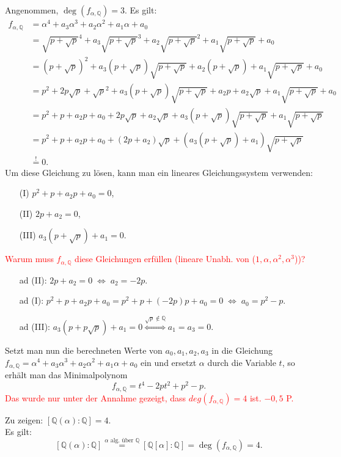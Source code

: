\documentclass[12pt]{article}
\newcommand{\corr}[1]{\textcolor{red}{#1}}
\newcommand{\gdw}{\;\Longleftrightarrow\;}
\newcommand{\grad}{\operatorname{deg}}
\begin{document}
\begin{enumerate}
	Angenommen, $\grad(f_{\alpha,\mathbb{Q}})=3$. Es gilt:
	\begin{align*}
		f_{\alpha,\mathbb{Q}}&=\alpha^4+a_3\alpha^3+a_2\alpha^2+a_1\alpha+a_0 \\
		&=\sqrt{p+\sqrt{p}}^4+a_3\sqrt{p+\sqrt{p}}^3+a_2\sqrt{p+\sqrt{p}}^2+a_1\sqrt{p+\sqrt{p}}+a_0 \\
		&=(p+\sqrt{p})^2+a_3(p+\sqrt{p})\sqrt{p+\sqrt{p}}+a_2(p+\sqrt{p})+a_1\sqrt{p+\sqrt{p}}+a_0 \\
		&=p^2+2p\sqrt{p}+\sqrt{p}^2+a_3(p+\sqrt{p})\sqrt{p+\sqrt{p}}+a_2p+a_2\sqrt{p}+a_1\sqrt{p+\sqrt{p}}+a_0 \\
		&=p^2+p+a_2p+a_0+2p\sqrt{p}+a_2\sqrt{p}+a_3(p+\sqrt{p})\sqrt{p+\sqrt{p}}+a_1\sqrt{p+\sqrt{p}} \\
		&=p^2+p+a_2p+a_0+(2p+a_2)\sqrt{p}+(a_3(p+\sqrt{p})+a_1)\sqrt{p+\sqrt{p}} \\
		&\overset{!}{=}0.
	\end{align*}
	Um diese Gleichung zu lösen, kann man ein lineares Gleichungssystem verwenden:
	\begin{enumerate}
		\item[(I)] $p^2+p+a_2p+a_0=0$,
		\item[(II)] $2p+a_2=0$,
		\item[(III)] $a_3(p+\sqrt{p})+a_1=0$.
	\end{enumerate}
\corr{Warum muss $f_{\alpha, \mathbb{Q}}$ diese Gleichungen erfüllen (lineare Unabh. von ($1,\alpha, \alpha^2,\alpha^3$))?}
	\begin{enumerate}
		\item[ad (II):] $2p+a_2=0\gdw a_2=-2p$.
		\item[ad (I):] $p^2+p+a_2p+a_0=p^2+p+(-2p)p+a_0=0\gdw a_0=p^2-p$.
		\item[ad (III):] $a_3(p+p\sqrt{p})+a_1=0\overset{\sqrt{p}\notin\mathbb{Q}}{\gdw}a_1=a_3=0$.
	\end{enumerate}
	Setzt man nun die berechneten Werte von $a_0,a_1,a_2,a_3$ in die Gleichung $f_{\alpha,\mathbb{Q}}=\alpha^4+a_3\alpha^3+a_2\alpha^2+a_1\alpha+a_0$ ein und ersetzt $\alpha$ durch die Variable $t$, so erhält man das Minimalpolynom
	$$f_{\alpha,\mathbb{Q}}=t^4-2pt^2+p^2-p.$$
\corr{Das wurde nur unter der Annahme gezeigt, dass $deg(f_{\alpha, \mathbb{Q}})=4$ ist. $-0,5$ P.}
	
	Zu zeigen: $\left[\mathbb{Q}(\alpha):\mathbb{Q}\right]=4$. \\
	Es gilt: $$\left[\mathbb{Q}(\alpha):\mathbb{Q}\right]\overset{\alpha\text{ alg. über }\mathbb{Q}}{=}\left[\mathbb{Q}[\alpha]:\mathbb{Q}\right]=\grad(f_{\alpha,\mathbb{Q}})=4.$$
	

\end{enumerate}
\end{document}
